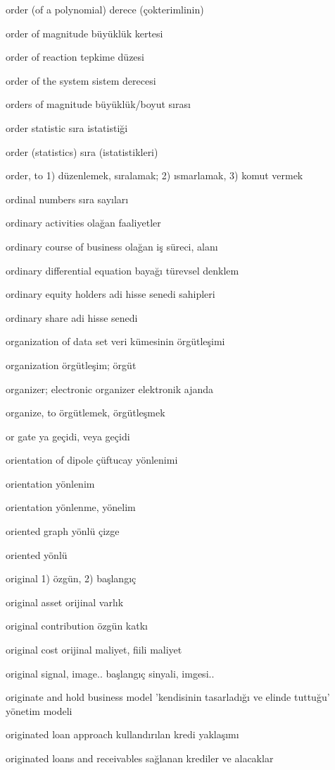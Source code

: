 \documentclass[12pt,fleqn]{article}\usepackage{../../common}
\begin{document}
order (of a polynomial) derece (çokterimlinin)

order of magnitude büyüklük kertesi

order of reaction tepkime düzesi

order of the system sistem derecesi

orders of magnitude büyüklük/boyut sırası

order statistic sıra istatistiği

order (statistics) sıra (istatistikleri)

order, to 1) düzenlemek, sıralamak; 2) ısmarlamak, 3) komut vermek

ordinal numbers sıra sayıları

ordinary activities olağan faaliyetler

ordinary course of business olağan iş süreci, alanı

ordinary differential equation bayağı türevsel denklem

ordinary equity holders adi hisse senedi sahipleri

ordinary share adi hisse senedi

organization of data set veri kümesinin örgütleşimi

organization örgütleşim; örgüt

organizer; electronic organizer elektronik ajanda

organize, to örgütlemek, örgütleşmek

or gate ya geçidi, veya geçidi

orientation of dipole çüftucay yönlenimi

orientation yönlenim

orientation yönlenme, yönelim

oriented graph yönlü çizge

oriented yönlü

original 1) özgün, 2) başlangıç

original asset orijinal varlık

original contribution özgün katkı

original cost orijinal maliyet, fiili maliyet

original signal, image.. başlangıç sinyali, imgesi..

originate and hold business model 'kendisinin tasarladığı ve elinde tuttuğu' yönetim modeli

originated loan approach kullandırılan kredi yaklaşımı

originated loans and receivables sağlanan krediler ve alacaklar
\end{document}
